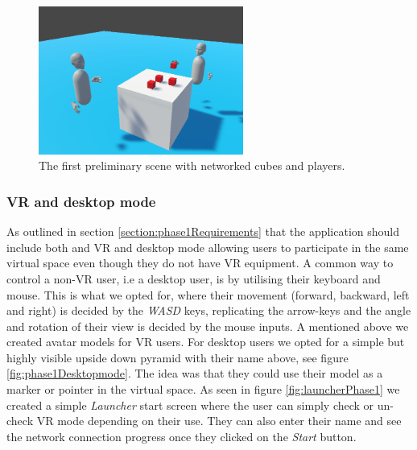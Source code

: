 \begin{figure}[]
  \centering
    \captionsetup{width=.6\linewidth}
    \includegraphics[width=0.6\textwidth]{fig/phase_1/networkedScene.PNG}
 \caption{The first preliminary scene with networked cubes and players.}
\label{fig:networkedScene}
\end{figure}

\subsubsection{VR and desktop mode}
As outlined in section \ref{section:phase1Requirements} that the application should include both and VR and desktop mode allowing users to participate in the same virtual space even though they do not have VR equipment. A common way to control a non-VR user, i.e a desktop user, is by utilising their keyboard and mouse. This is what we opted for, where their movement (forward, backward, left and right) is decided by the \textit{WASD} keys, replicating the arrow-keys and the angle and rotation of their view is decided by the mouse inputs. A mentioned above we created avatar models for VR users. For desktop users we opted for a simple but highly visible upside down pyramid with their name above, see figure \ref{fig:phase1Desktopmode}. The idea was that they could use their model as a marker or pointer in the virtual space. 
As seen in figure \ref{fig:launcherPhase1} we created a simple \textit{Launcher} start screen where the user can simply check or un-check VR mode depending on their use. They can also enter their name and see the network connection progress once they clicked on the \textit{Start} button. 



